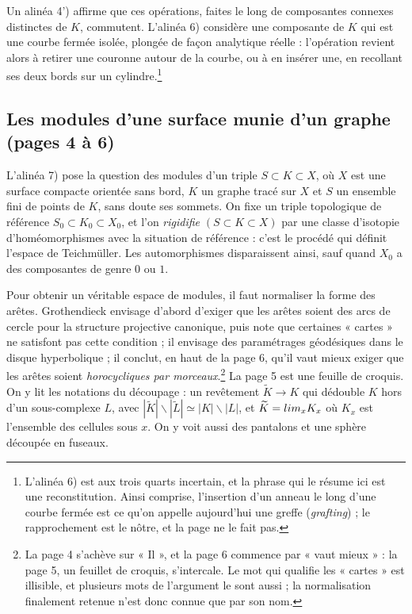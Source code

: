 \documentclass[11pt,a4paper]{article}
\begin{document}
Un alinéa 4') affirme que ces opérations, faites le long de composantes
connexes distinctes de $K$, commutent. L'alinéa 6) considère une composante
de $K$ qui est une courbe fermée isolée, plongée de façon analytique réelle :
l'opération revient alors à retirer une couronne autour de la courbe, ou à en
insérer une, en recollant ses deux bords sur un cylindre.\footnote{L'alinéa 6)
est aux trois quarts incertain, et la phrase qui le résume ici est une
reconstitution. Ainsi comprise, l'insertion d'un anneau le long d'une courbe
fermée est ce qu'on appelle aujourd'hui une greffe (\emph{grafting}) ; le
rapprochement est le nôtre, et la page ne le fait pas.}

\subsection*{Les modules d'une surface munie d'un graphe (pages 4 à 6)}

L'alinéa 7) pose la question des modules d'un triple $S \subset K \subset X$,
où $X$ est une surface compacte orientée sans bord, $K$ un graphe tracé sur
$X$ et $S$ un ensemble fini de points de $K$, sans doute ses sommets. On fixe
un triple topologique de référence $S_0 \subset K_0 \subset X_0$, et l'on
\emph{rigidifie} $(S \subset K \subset X)$ par une classe d'isotopie
d'homéomorphismes avec la situation de référence : c'est le procédé qui
définit l'espace de Teichmüller. Les automorphismes disparaissent ainsi, sauf
quand $X_0$ a des composantes de genre $0$ ou $1$.

Pour obtenir un véritable espace de modules, il faut normaliser la forme des
arêtes. Grothendieck envisage d'abord d'exiger que les arêtes soient des arcs
de cercle pour la structure projective canonique, puis note que certaines
« cartes » ne satisfont pas cette condition ; il envisage des paramétrages
géodésiques dans le disque hyperbolique ; il conclut, en haut de la page 6,
qu'il vaut mieux exiger que les arêtes soient \emph{horocycliques par
morceaux}.\footnote{La page 4 s'achève sur « Il », et la page 6 commence par
« vaut mieux » : la page 5, un feuillet de croquis, s'intercale. Le mot qui
qualifie les « cartes » est illisible, et plusieurs mots de l'argument le
sont aussi ; la normalisation finalement retenue n'est donc connue que par son
nom.} La page 5 est une feuille de croquis. On y lit les notations du
découpage : un revêtement $\widetilde{K} \to K$ qui dédouble $K$ hors d'un
sous-complexe $L$, avec $|\widetilde{K}| \smallsetminus |\widetilde{L}|
\simeq |K| \smallsetminus |L|$, et $\widetilde{K} = \varinjlim_{x}K_{x}$ où
$K_x$ est l'ensemble des cellules sous $x$. On y voit aussi des pantalons et
une sphère découpée en fuseaux.
\end{document}

